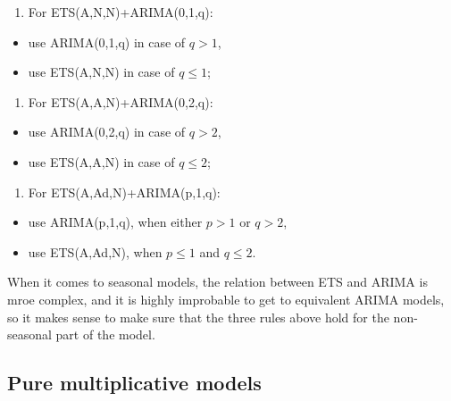 \documentclass[
]{book}
\providecommand{\tightlist}{%
  \setlength{\itemsep}{0pt}\setlength{\parskip}{0pt}}
\theoremstyle{definition}
\theoremstyle{definition}
\theoremstyle{definition}
\theoremstyle{definition}
\theoremstyle{remark}
\begin{document}
\begin{enumerate}
\def\labelenumi{\arabic{enumi}.}
\tightlist
\item
  For ETS(A,N,N)+ARIMA(0,1,q):
\end{enumerate}

\begin{itemize}
\tightlist
\item
  use ARIMA(0,1,q) in case of \(q >1\),
\item
  use ETS(A,N,N) in case of \(q\leq 1\);
\end{itemize}

\begin{enumerate}
\def\labelenumi{\arabic{enumi}.}
\setcounter{enumi}{1}
\tightlist
\item
  For ETS(A,A,N)+ARIMA(0,2,q):
\end{enumerate}

\begin{itemize}
\tightlist
\item
  use ARIMA(0,2,q) in case of \(q >2\),
\item
  use ETS(A,A,N) in case of \(q \leq 2\);
\end{itemize}

\begin{enumerate}
\def\labelenumi{\arabic{enumi}.}
\setcounter{enumi}{2}
\tightlist
\item
  For ETS(A,Ad,N)+ARIMA(p,1,q):
\end{enumerate}

\begin{itemize}
\tightlist
\item
  use ARIMA(p,1,q), when either \(p>1\) or \(q>2\),
\item
  use ETS(A,Ad,N), when \(p \leq 1\) and \(q \leq 2\).
\end{itemize}

When it comes to seasonal models, the relation between ETS and ARIMA is mroe complex, and it is highly improbable to get to equivalent ARIMA models, so it makes sense to make sure that the three rules above hold for the non-seasonal part of the model.

\hypertarget{pure-multiplicative-models}{%
\subsection{Pure multiplicative models}\label{pure-multiplicative-models}}
\end{document}
